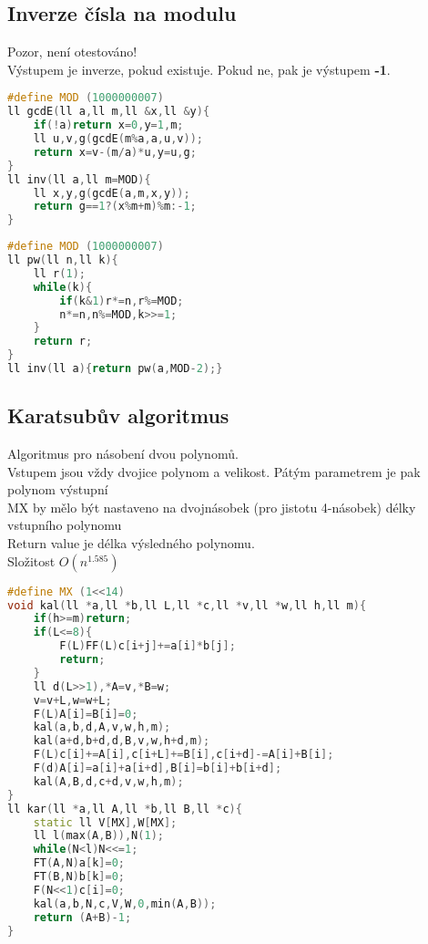 \documentclass[11pt]{article}
\begin{document}
\subsection{Inverze čísla na modulu}
Pozor, není otestováno!
\\Výstupem je inverze, pokud existuje. Pokud ne, pak je výstupem \textbf{-1}.
\begin{lstlisting}[language=C++]
#define MOD (1000000007)
ll gcdE(ll a,ll m,ll &x,ll &y){
    if(!a)return x=0,y=1,m;
    ll u,v,g(gcdE(m%a,a,u,v));
    return x=v-(m/a)*u,y=u,g;
}
ll inv(ll a,ll m=MOD){
    ll x,y,g(gcdE(a,m,x,y));
    return g==1?(x%m+m)%m:-1;
} 
\end{lstlisting}
\begin{lstlisting}[language=C++]
#define MOD (1000000007)
ll pw(ll n,ll k){
    ll r(1);
    while(k){
        if(k&1)r*=n,r%=MOD;
        n*=n,n%=MOD,k>>=1;
    }
    return r;
}
ll inv(ll a){return pw(a,MOD-2);}
\end{lstlisting}
\subsection{Karatsubův algoritmus}
Algoritmus pro násobení dvou polynomů.
\\Vstupem jsou vždy dvojice polynom a velikost. Pátým parametrem je pak polynom výstupní
\\MX by mělo být nastaveno na dvojnásobek (pro jistotu 4-násobek) délky vstupního polynomu
\\Return value je délka výsledného polynomu.
\\Složitost $O(n^{1.585})$
\begin{lstlisting}[language=C++]
#define MX (1<<14)
void kal(ll *a,ll *b,ll L,ll *c,ll *v,ll *w,ll h,ll m){
    if(h>=m)return;
    if(L<=8){
        F(L)FF(L)c[i+j]+=a[i]*b[j];
        return;
    }
    ll d(L>>1),*A=v,*B=w;
    v=v+L,w=w+L;
    F(L)A[i]=B[i]=0;
    kal(a,b,d,A,v,w,h,m);
    kal(a+d,b+d,d,B,v,w,h+d,m);
    F(L)c[i]+=A[i],c[i+L]+=B[i],c[i+d]-=A[i]+B[i];
    F(d)A[i]=a[i]+a[i+d],B[i]=b[i]+b[i+d];
    kal(A,B,d,c+d,v,w,h,m);
}
ll kar(ll *a,ll A,ll *b,ll B,ll *c){
    static ll V[MX],W[MX];
    ll l(max(A,B)),N(1);
    while(N<l)N<<=1;
    FT(A,N)a[k]=0;
    FT(B,N)b[k]=0;
    F(N<<1)c[i]=0;
    kal(a,b,N,c,V,W,0,min(A,B));
    return (A+B)-1;
}
\end{lstlisting}
\end{document}
